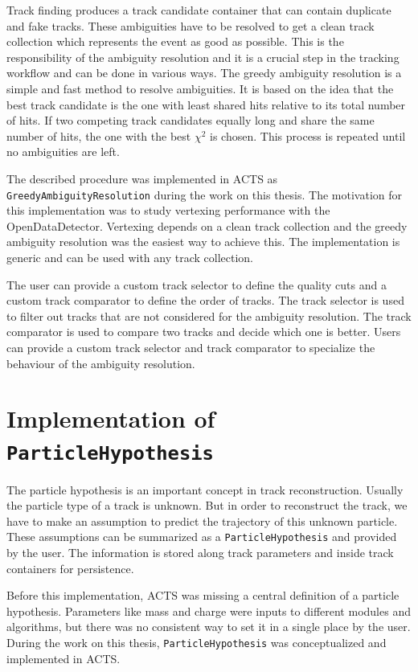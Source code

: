 Track finding produces a track candidate container that can contain duplicate and fake tracks. These ambiguities have to be resolved to get a clean track collection which represents the event as good as possible. This is the responsibility of the ambiguity resolution and it is a crucial step in the tracking workflow and can be done in various ways. The greedy ambiguity resolution is a simple and fast method to resolve ambiguities. It is based on the idea that the best track candidate is the one with least shared hits relative to its total number of hits. If two competing track candidates equally long and share the same number of hits, the one with the best $\chi^2$ is chosen. This process is repeated until no ambiguities are left.

The described procedure was implemented in ACTS as \texttt{GreedyAmbiguityResolution} during the work on this thesis. The motivation for this implementation was to study vertexing performance with the OpenDataDetector. Vertexing depends on a clean track collection and the greedy ambiguity resolution was the easiest way to achieve this. The implementation is generic and can be used with any track collection.

The user can provide a custom track selector to define the quality cuts and a custom track comparator to define the order of tracks. The track selector is used to filter out tracks that are not considered for the ambiguity resolution. The track comparator is used to compare two tracks and decide which one is better. Users can provide a custom track selector and track comparator to specialize the behaviour of the ambiguity resolution.

\section{Implementation of \texttt{ParticleHypothesis}}

The particle hypothesis is an important concept in track reconstruction. Usually the particle type of a track is unknown. But in order to reconstruct the track, we have to make an assumption to predict the trajectory of this unknown particle. These assumptions can be summarized as a \texttt{ParticleHypothesis} and provided by the user. The information is stored along track parameters and inside track containers for persistence.

Before this implementation, ACTS was missing a central definition of a particle hypothesis. Parameters like mass and charge were inputs to different modules and algorithms, but there was no consistent way to set it in a single place by the user. During the work on this thesis, \texttt{ParticleHypothesis} was conceptualized and implemented in ACTS.

